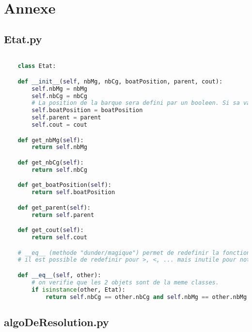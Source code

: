 \documentclass[a4paper, 12pt, french]{book}
\begin{document}
\appendix
\chapter{Annexe}
\section{Etat.py}
\begin{lstlisting}[language=Python, caption=Python example] 

    class Etat:

    def __init__(self, nbMg, nbCg, boatPosition, parent, cout):
        self.nbMg = nbMg
        self.nbCg = nbCg
        # La position de la barque sera defini par un booleen. Si sa valeur est egale a vraie alors la barque est a guache sinon elle est a droite
        self.boatPosition = boatPosition
        self.parent = parent
        self.cout = cout

    def get_nbMg(self):
        return self.nbMg

    def get_nbCg(self):
        return self.nbCg

    def get_boatPosition(self):
        return self.boatPosition

    def get_parent(self):
        return self.parent

    def get_cout(self):
        return self.cout

    # __eq__ (methode "dunder/magique") permet de redefinir la fonction ==. Cela nous sera utile pour verifie si 2 etats sont egaux. (fonctionne avec .remove() pour la comparaison d'etat)
    # il est possible de redefinir pour >, <, ... mais inutile pour notre cas.

    def __eq__(self, other):
        # on verifie que les 2 objets sont de la meme classes.
        if isinstance(other, Etat):
            return self.nbCg == other.nbCg and self.nbMg == other.nbMg and self.boatPosition == other.boatPosition
\end{lstlisting}

\section{algoDeResolution.py}
\end{document}
